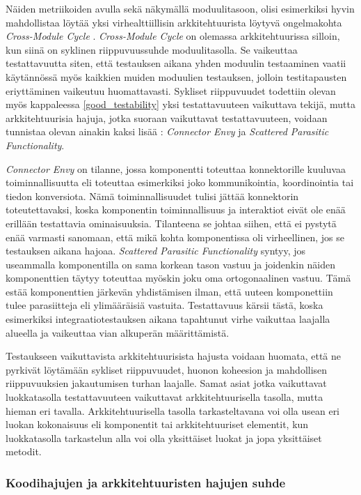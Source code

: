 \documentclass[finnish]{tktltiki2}
\numberwithin{table}{section}
\theoremstyle{definition}
\theoremstyle{remark}
\begin{document}
\noindent
Näiden metriikoiden avulla sekä näkymällä moduulitasoon, olisi esimerkiksi hyvin mahdollistaa löytää yksi virhealttiillisin arkkitehtuurista löytyvä ongelmakohta \textit{Cross-Module Cycle} \citep[s. 57]{HotSpot}. \textit{Cross-Module Cycle} on olemassa arkkitehtuurissa silloin, kun siinä on syklinen riippuvuussuhde moduulitasolla. Se vaikeuttaa testattavuutta siten, että testauksen aikana yhden moduulin testaaminen vaatii käytännössä myös kaikkien muiden moduulien testauksen, jolloin testitapausten eriyttäminen vaikeutuu huomattavasti. Sykliset riippuvuudet todettiin olevan myös kappaleessa \ref{good_testability} yksi testattavuuteen vaikuttava tekijä, mutta arkkitehtuurisia hajuja, jotka suoraan vaikuttavat testattavuuteen, voidaan tunnistaa olevan ainakin kaksi lisää \citep{garcia_identifying_2009}:  \textit{Connector Envy} ja \textit{Scattered Parasitic Functionality}.

\textit{Connector Envy} on tilanne, jossa komponentti toteuttaa konnektorille kuuluvaa toiminnallisuutta eli toteuttaa esimerkiksi joko kommunikointia, koordinointia tai tiedon konversiota. Nämä toiminnallisuudet tulisi jättää konnektorin toteutettavaksi, koska komponentin toiminnallisuus ja interaktiot eivät ole enää erillään testattavia ominaisuuksia. Tilanteena se johtaa siihen, että ei pystytä enää varmasti sanomaan, että mikä kohta komponentissa oli virheellinen, jos se testauksen aikana hajoaa. \textit{Scattered Parasitic Functionality} syntyy, jos useammalla komponentilla on sama korkean tason vastuu ja joidenkin näiden komponenttien täytyy toteuttaa myöskin joku oma ortogonaalinen vastuu. Tämä estää komponenttien järkevän yhdistämisen ilman, että uuteen komponettiin tulee parasiitteja eli ylimääräisiä vastuita. Testattavuus kärsii tästä, koska esimerkiksi integraatiotestauksen aikana tapahtunut virhe vaikuttaa laajalla alueella ja vaikeuttaa vian alkuperän määrittämistä. 

Testaukseen vaikuttavista arkkitehtuurisista hajusta voidaan huomata, että ne pyrkivät löytämään sykliset riippuvuudet, huonon koheesion ja mahdollisen riippuvuuksien jakautumisen turhan laajalle. Samat asiat jotka vaikuttavat luokkatasolla testattavuuteen vaikuttavat arkkitehtuurisella tasolla, mutta hieman eri tavalla. Arkkitehtuurisella tasolla tarkasteltavana voi olla usean eri luokan kokonaisuus eli komponentit tai arkkitehtuuriset elementit, kun luokkatasolla tarkastelun alla voi olla yksittäiset luokat ja jopa yksittäiset metodit.


\subsubsection{Koodihajujen ja arkkitehtuuristen hajujen suhde}
\end{document}
